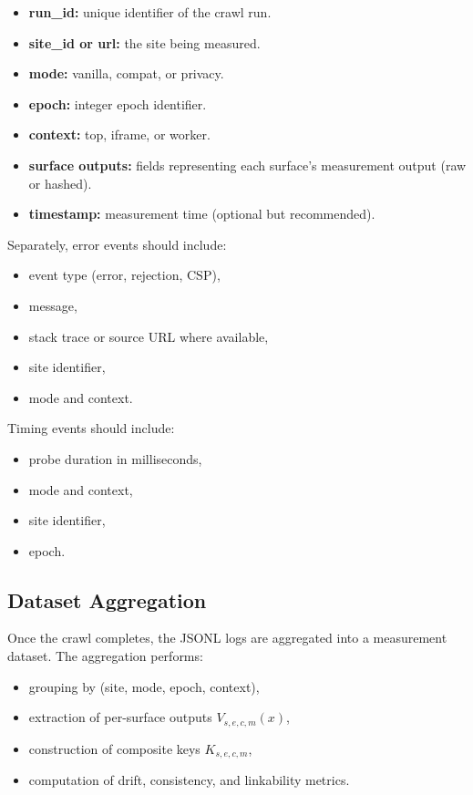 \documentclass[11pt]{report}
\begin{document}
\begin{itemize}
    \item \textbf{run\_id:} unique identifier of the crawl run.
    \item \textbf{site\_id or url:} the site being measured.
    \item \textbf{mode:} vanilla, compat, or privacy.
    \item \textbf{epoch:} integer epoch identifier.
    \item \textbf{context:} top, iframe, or worker.
    \item \textbf{surface outputs:} fields representing each surface’s measurement output (raw or hashed).
    \item \textbf{timestamp:} measurement time (optional but recommended).
\end{itemize}

Separately, error events should include:
\begin{itemize}
    \item event type (error, rejection, CSP),
    \item message,
    \item stack trace or source URL where available,
    \item site identifier,
    \item mode and context.
\end{itemize}

Timing events should include:
\begin{itemize}
    \item probe duration in milliseconds,
    \item mode and context,
    \item site identifier,
    \item epoch.
\end{itemize}

\subsection{Dataset Aggregation}

Once the crawl completes, the JSONL logs are aggregated into a measurement dataset. The aggregation performs:

\begin{itemize}
    \item grouping by (site, mode, epoch, context),
    \item extraction of per-surface outputs $V_{s,e,c,m}(x)$,
    \item construction of composite keys $K_{s,e,c,m}$,
    \item computation of drift, consistency, and linkability metrics.
\end{itemize}
\end{document}
